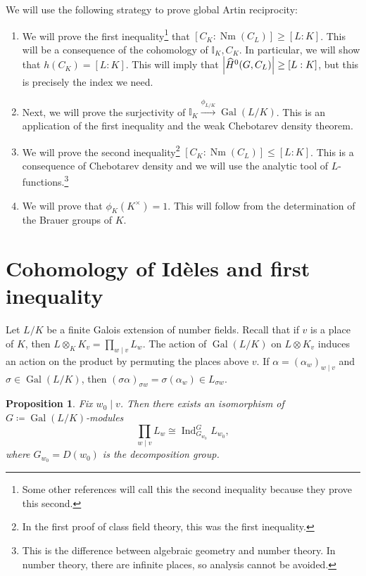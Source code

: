 \documentclass[leqno, openany]{memoir}
\newtheorem{prop}[thm]{Proposition}
\theoremstyle{definition}
\theoremstyle{remark}
\theoremstyle{plain}
\theoremstyle{definition}
\theoremstyle{remark}
\newcommand{\I}{\mathbb{I}}
\newcommand{\wh}[1]{\widehat{#1}}
\DeclareMathOperator{\Gal}{Gal}
\DeclareMathOperator{\Ind}{Ind}
\DeclareMathOperator{\Nm}{Nm}
\begin{document}
We will use the following strategy to prove global Artin reciprocity:
\begin{enumerate}
    \item We will prove the first inequality\footnote{Some other references will call this the second inequality because they prove this second.} that $[C_K:\Nm(C_L)] \geq [L:K]$. This will be a consequence of the cohomology of $\I_K, C_K$. In particular, we will show that $h(C_K) = [L:K]$. This will imply that $\abs{\wh{H}^0(G, C_L)} \geq [L:K]$, but this is precisely the index we need.
    \item Next, we will prove the surjectivity of $\I_K \xrightarrow{\phi_{L/K}} \Gal(L/K)$. This is an application of the first inequality and the weak Chebotarev density theorem.
    \item We will prove the second inequality\footnote{In the first proof of class field theory, this was the first inequality.} $[C_K : \Nm(C_L)] \leq [L:K]$. This is a consequence of Chebotarev density and we will use the analytic tool of $L$-functions.\footnote{This is the difference between algebraic geometry and number theory. In number theory, there are infinite places, so analysis cannot be avoided.}
    \item We will prove that $\phi_K(K^{\times}) = 1$. This will follow from the determination of the Brauer groups of $K$.
\end{enumerate}

\section{Cohomology of Id\`eles and first inequality}%
\label{sec:cohomology_of_id`eles}

Let $L/K$ be a finite Galois extension of number fields. Recall that if $v$ is a place of $K$, then $L \otimes_K K_v = \prod_{w \mid v} L_w$. The action of $\Gal(L/K)$ on $L \otimes K_v$ induces an action on the product by permuting the places above $v$. If $\alpha = {(\alpha_w)}_{w \mid v}$ and $\sigma \in \Gal(L/K)$, then ${(\sigma \alpha)}_{\sigma w} = \sigma (\alpha_w) \in L_{\sigma w}$.

\begin{prop}
    Fix $w_0 \mid v$. Then there exists an isomorphism of $G \coloneqq \Gal(L/K)$-modules
    \[ \prod_{w \mid v} L_w \cong \Ind_{G_{w_0}}^G L_{w_0}, \]
    where $G_{w_0} = D(w_0)$ is the decomposition group.
\end{prop}
\end{document}
